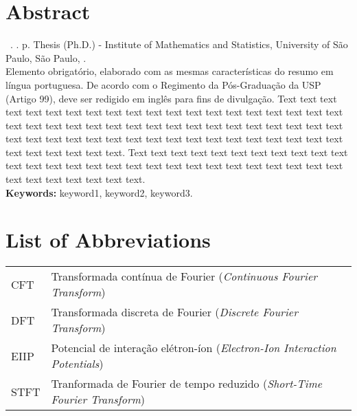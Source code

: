 \documentclass[11pt,twoside,a4paper]{book}
\begin{document}
\chapter*{Abstract}
\noindent \surnameAbbr~\textbf{\phdTitle}.
\thesisYear. \thesisPages p. Thesis (Ph.D.) - Institute of Mathematics and Statistics,
University of São Paulo, São Paulo, \thesisYear.
\\


Elemento obrigatório, elaborado com as mesmas características do resumo em
língua portuguesa. De acordo com o Regimento da Pós-Graduação da USP (Artigo
99), deve ser redigido em inglês para fins de divulgação. 
Text text text text text text text text text text text text text text text text
text text text text text text text text text text text text text text text text
text text text text text text text text text text text text text text text text
text text text text text text text text text text text text.
Text text text text text text text text text text text text text text text text
text text text text text text text text text text text text text text text text
text text text.
\\

\noindent \textbf{Keywords:} keyword1, keyword2, keyword3.

\tableofcontents    %

\chapter{List of Abbreviations}
\begin{tabular}{ll}
         CFT         & Transformada contínua de Fourier (\emph{Continuous Fourier Transform})\\
         DFT         & Transformada discreta de Fourier (\emph{Discrete Fourier Transform})\\
        EIIP         & Potencial de interação elétron-íon (\emph{Electron-Ion Interaction Potentials})\\
        STFT         & Tranformada de Fourier de tempo reduzido (\emph{Short-Time Fourier Transform})\\
\end{tabular}

\end{document}
